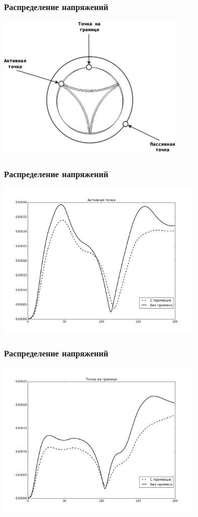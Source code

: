 \documentclass[14pt]{beamer}
\begin{document}
\begin{frame}
\frametitle{Распределение напряжений}
    \begin{center}
        \includegraphics[width=9cm]{valve_points.png}
    \end{center}
\end{frame}

\begin{frame}
\frametitle{Распределение напряжений}
    \begin{center}
        \includegraphics[width=10cm]{forces_active_point.png}
    \end{center}
\end{frame}

\begin{frame}
\frametitle{Распределение напряжений}
    \begin{center}
        \includegraphics[width=10cm]{forces_boundary_point.png}
    \end{center}
\end{frame}
\end{document}
